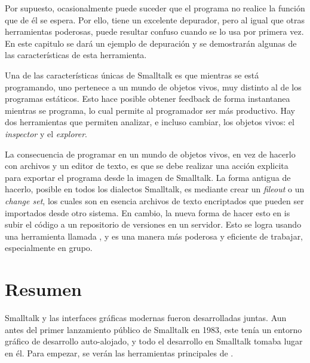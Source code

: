\documentclass[a4paper,10pt,twoside]{book}
\begin{document}
Por supuesto, ocasionalmente puede suceder que el programa no realice la funci\'on que de \'el se espera. Por ello, \pharo tiene un excelente depurador, pero al igual que otras herramientas poderosas, puede resultar confuso cuando se lo usa por primera vez. En este capitulo se dar\'a un ejemplo de depuraci\'on y se demostrar\'an algunas de las caracter\'isticas de esta herramienta. 

Una de las caracter\'isticas \'unicas de Smalltalk es que mientras se est\'a programando, uno pertenece a un mundo de objetos vivos, muy distinto al de los programas est\'aticos. Esto hace posible obtener feedback de forma instantanea mientras se programa, lo cual permite al programador ser m\'as productivo. Hay dos herramientas que permiten analizar, e incluso cambiar, los objetos vivos: el \emph{inspector} y el \emph{explorer}.

La consecuencia de programar en un mundo de objetos vivos, en vez de hacerlo con archivos y un editor de texto, es que se debe realizar una acci\'on explicita para exportar el programa desde la imagen de Smalltalk.  
La forma antigua de hacerlo, posible en todos los dialectos Smalltalk, es mediante crear un \emph{fileout} o un \emph{change set}, los cuales son en esencia archivos de texto encriptados que pueden ser importados desde otro sistema.  
En cambio, la nueva forma de hacer esto en \pharo is subir el c\'odigo a un repositorio de versiones en un servidor.  Esto se logra usando una herramienta llamada , y es una manera m\'as poderosa y eficiente de trabajar, especialmente en grupo.


\section{Resumen}

Smalltalk y las interfaces gr\'aficas modernas fueron desarrolladas juntas.
Aun antes del primer lanzamiento p\'ublico de Smalltalk en 1983, este ten\'ia un entorno gr\'afico de desarrollo auto-alojado, y todo el desarrollo en Smalltalk tomaba lugar en \'el.
Para empezar, se ver\'an las herramientas principales de \pharo.
\end{document}
